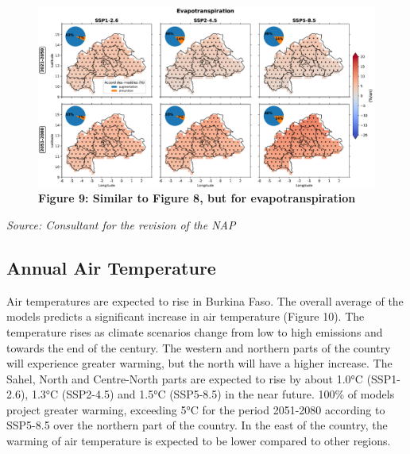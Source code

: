\documentclass[
]{book}
\begin{document}
\begin{figure}
\centering
\includegraphics{Figures and Photos/Figure 9.png}
\caption{\textbf{Figure 9: Similar to Figure 8, but for evapotranspiration}}
\end{figure}

\emph{Source: Consultant for the revision of the NAP}

\subsection{Annual Air Temperature}\label{annual-air-temperature}

Air temperatures are expected to rise in Burkina Faso. The overall average of the models predicts a significant increase in air temperature (Figure 10). The temperature rises as climate scenarios change from low to high emissions and towards the end of the century. The western and northern parts of the country will experience greater warming, but the north will have a higher increase. The Sahel, North and Centre-North parts are expected to rise by about 1.0°C (SSP1-2.6), 1.3°C (SSP2-4.5) and 1.5°C (SSP5-8.5) in the near future. 100\% of models project greater warming, exceeding 5°C for the period 2051-2080 according to SSP5-8.5 over the northern part of the country. In the east of the country, the warming of air temperature is expected to be lower compared to other regions.
\end{document}
